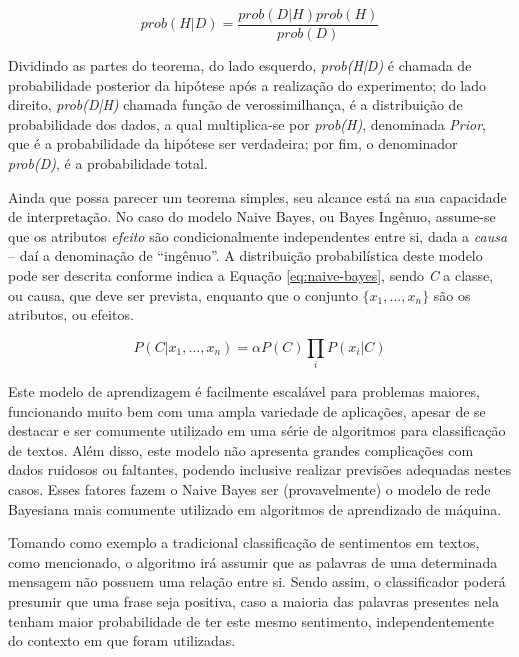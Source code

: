 \documentclass[oneside,openright,12pt]{ufsm_2015} %
\begin{document}
    \begin{equation} \label{eq:teorema-bayes}
    prob(H|D) = \frac{prob(D|H)prob(H)}{prob(D)}
    \end{equation}
    
    \par Dividindo as partes do teorema, do lado esquerdo, \textit{prob(H|D)} é chamada de probabilidade posterior da hipótese após a realização do experimento; do lado direito, \textit{prob(D|H)} chamada função de verossimilhança, é a distribuição de probabilidade dos dados, a qual multiplica-se por \textit{prob(H)}, denominada \textit{Prior}, que é a probabilidade da hipótese ser verdadeira; por fim, o denominador \textit{prob(D)}, é a probabilidade total.
    
    \par Ainda que possa parecer um teorema simples, seu alcance está na sua capacidade de interpretação. No caso do modelo Naive Bayes, ou Bayes Ingênuo, assume-se que os atributos \textit{efeito} são condicionalmente independentes entre si, dada a \textit{causa} -- daí a denominação de ``ingênuo''. A distribuição probabilística deste modelo pode ser descrita conforme indica a Equação \ref{eq:naive-bayes}, sendo \textit{C} a classe, ou causa, que deve ser prevista, enquanto que o conjunto $\{x_1, ..., x_n\}$ são os atributos, ou efeitos.
    
    \begin{equation} \label{eq:naive-bayes}
    P(C | x_1, ..., x_n) = \alpha P(C)\prod_i{P(x_i | C)}
    \end{equation}
    
    \par Este modelo de aprendizagem é facilmente escalável para problemas maiores, funcionando muito bem com uma ampla variedade de aplicações, apesar de se destacar e ser comumente utilizado em uma série de algoritmos para classificação de textos. Além disso, este modelo não apresenta grandes complicações com dados ruidosos ou faltantes, podendo inclusive realizar previsões adequadas nestes casos. Esses fatores fazem o Naive Bayes ser (provavelmente) o modelo de rede Bayesiana mais comumente utilizado em algoritmos de aprendizado de máquina.
    
    \par Tomando como exemplo a tradicional classificação de sentimentos em textos, como mencionado, o algoritmo irá assumir que as palavras de uma determinada mensagem não possuem uma relação entre si. Sendo assim, o classificador poderá presumir que uma frase seja positiva, caso a maioria das palavras presentes nela tenham maior probabilidade de ter este mesmo sentimento, independentemente do contexto em que foram utilizadas.
    
\end{document}
